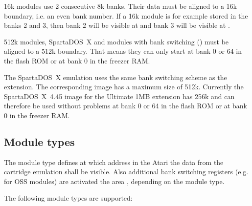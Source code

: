 16k modules use 2 consecutive 8k banks. Their data must be aligned to a 16k
boundary, i.e. an even bank number. If a 16k module is for example stored in the
banks 2 and 3, then bank 2 will be visible at  and bank
3 will be visible at .

512k modules, SpartaDOS~X and modules with  bank switching () must be aligned to a 512k boundary. That means they can only start at bank
0 or 64 in the flash ROM or at bank 0 in the freezer RAM.

The SpartaDOS~X emulation uses the same bank switching scheme as the\linebreak
{} extension. The corresponding image has a maximum size of
512k. Currently the SpartaDOS~X~4.45 image for the Ultimate 1MB extension has
256k and can therefore be used without problems at bank 0 or 64 in the flash ROM
or at bank 0 in the freezer RAM.

\subsection{Module types}
The module type defines at which address in the Atari the data from the
cartridge emulation shall be visible. Also additional bank switching registers
(e.g. for OSS modules) are activated the area , depending on
the module type.

The following module types are supported:

